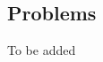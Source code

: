 \begin{example}
\begin{itemize}[itemsep=1.5em]
%
\end{itemize}
\end{example}

\vspace*{2em}

\subsection{Problems}
\vspace{0.1in}
To be added
%
